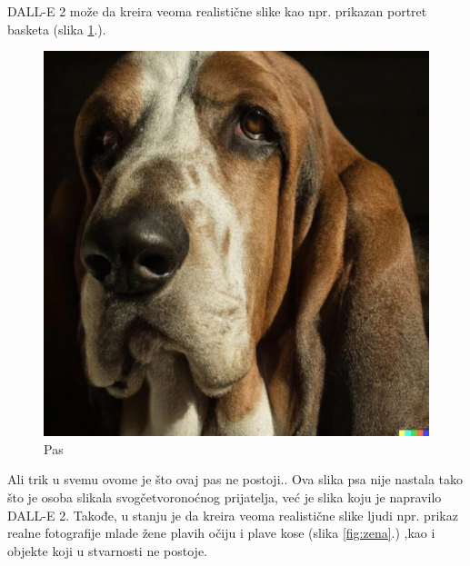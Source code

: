 \documentclass[a4paper]{article}
\begin{document}
DALL-E 2 može da kreira veoma realistične slike kao npr. prikazan  portret basketa (slika \ref{fig:pas}.).
\begin{nesto1}
\begin{figure}[h!]
\begin{center}
\includegraphics[scale=0.09]{pas.jpg}
\end{center}
\caption{Pas}
\label{fig:pas}
\end{figure}

Ali trik u svemu ovome je što ovaj pas ne postoji.. Ova slika psa nije nastala tako što je osoba slikala svogčetvoronoćnog prijatelja, već je slika koju je napravilo DALL-E 2. Takođe, u stanju je da kreira veoma realistične slike ljudi npr. prikaz  realne fotografije mlade žene plavih očiju i plave kose (slika \ref{fig:zena}.) ,kao i objekte koji u stvarnosti ne postoje.


\end{nesto1}
\end{document}
